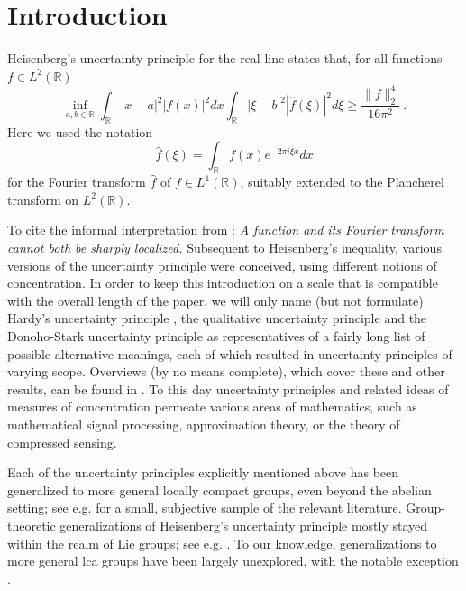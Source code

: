 \documentclass[12pt, reqno]{amsart}
\begin{document}



\maketitle

\section{Introduction}\label{sec1}

Heisenberg's uncertainty principle for the real line states that, for all functions $f \in L^2(\mathbb{R})$
\begin{equation} \label{eqn:HI}
\inf_{a,b \in \mathbb{R}}
\int_{\mathbb{R}} |x-a|^2 |f(x)|^2 dx \int_{\mathbb{R}}|\xi-b|^2 |\widehat{f}(\xi)|^2 d\xi \ge 
\frac{\| f \|_2^4}{16 \pi^2}~.
\end{equation}
Here we used the notation 
\[
\widehat{f}(\xi) = \int_{\mathbb{R}} f(x) e^{-2\pi i \xi x} dx
\] for the Fourier transform $\widehat{f}$ of $f \in L^1(\mathbb{R})$, suitably extended to the Plancherel transform on $L^2(\mathbb{R})$.

To cite the informal interpretation from \cite{MR1448337}: 
\textit{A function and its Fourier transform cannot both be sharply localized.}
Subsequent to Heisenberg's inequality, various versions of the uncertainty principle were conceived, using different notions of concentration. In order to keep this introduction on a scale that is compatible with the overall length of the paper, we will only name (but not formulate) Hardy's uncertainty principle \cite{MR1574130}, the qualitative uncertainty principle \cite{MR780328} and the Donoho-Stark uncertainty principle \cite{MR997928} as representatives of a fairly long list of possible alternative meanings, each of which resulted in uncertainty principles of varying scope. Overviews (by no means complete), which cover these and other results, can be found in \cite{MR1448337,MR3265736,MR4229152}. To this day uncertainty principles and related ideas of measures of concentration permeate various areas of mathematics, such as mathematical signal processing, approximation theory, or the theory of compressed sensing. 

Each of the uncertainty principles explicitly mentioned above has been generalized to more general locally compact groups, even beyond the abelian setting; see e.g. \cite{MR2587584,MR3336090,MR4744878,MR1353372,MR1181081,MR2122203} for a small, subjective sample of the relevant literature. 
Group-theoretic generalizations of Heisenberg's uncertainty principle mostly stayed within the realm of Lie groups; see e.g. \cite{MR2355602,MR3336090}. To our knowledge, generalizations to more general lca groups have been largely unexplored, with the notable exception \cite{MR2126447}.
\end{document}
